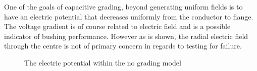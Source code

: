 
One of the goals of capacitive grading, beyond generating uniform fields is to have an electric potential that decreases uniformly from the conductor to flange. The voltage gradient is of course related to electric field and is a possible indicator of bushing performance. However as is shown, the radial electric field through the centre is not of primary concern in regards to testing for failure.

\begin{figure}[!h]
  \centering
{} 
\caption{The electric potential within the no grading model}
\label{Figure:No_Grad_Failing_potential}
\end{figure}

\pagebreak

